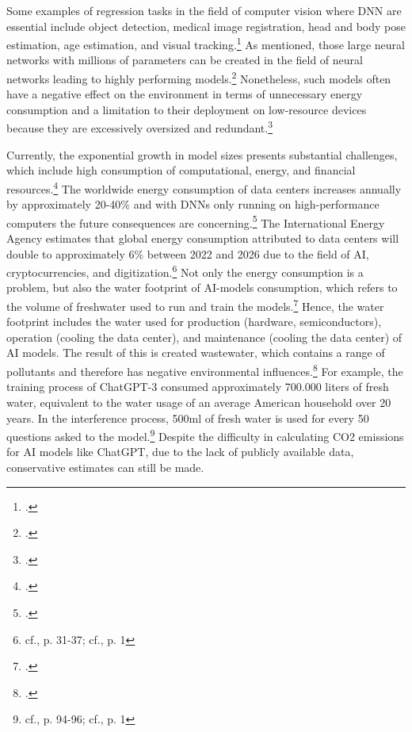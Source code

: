 Some examples of regression tasks in the field of computer vision where \ac{DNN} are essential include object detection, medical image registration, head and body pose estimation, age estimation, and visual tracking.\footcite[cf.][325-326]{gustafssonEnergyBasedModelsDeep2020}
As mentioned, those large neural networks with millions of parameters can be created in the field of neural networks leading to highly performing models.\footcite[cf.][152]{marinoDeepNeuralNetworks2023}
Nonetheless, such models often have a negative effect on the environment in terms of unnecessary energy consumption and a limitation to their deployment on low-resource devices because they are excessively oversized and redundant.\footcite[cf.][152]{marinoDeepNeuralNetworks2023}

Currently, the exponential growth in model sizes presents substantial challenges, which include high consumption of computational, energy, and financial resources.\footcite[cf.][1-2]{baiEfficiencySystematicSurvey2024}
The worldwide energy consumption of data centers increases annually by approximately 20-40\% and with \ac{DNN}s only running on high-performance computers the future
consequences are concerning.\footcite[cf.][1]{hintemannDataCenters20212022} 
The International Energy Agency estimates that global energy consumption attributed to data centers will double to approximately 6\% between 2022 and 2026 due to the field of AI, cryptocurrencies, and digitization.\footnote{cf.\cite{anon.Electricity2024Analysis2024}, p. 31-37; cf.\cite{jacksonAIBoomWill2024}, p. 1}
Not only the energy consumption is a problem, but also the water footprint of AI-models consumption, which refers to the volume of freshwater used to run and train the models.\footcite[cf.][92-93]{georgeEnvironmentalImpactAI2023}
Hence, the water footprint includes the water used for production (hardware, semiconductors), operation (cooling the data center), and maintenance (cooling the data center) of AI models.
The result of this is created wastewater, which contains a range of pollutants and therefore has negative environmental influences.\footcite[cf.][94-96]{georgeEnvironmentalImpactAI2023}
For example, the training process of ChatGPT-3 consumed approximately 700.000 liters of fresh water, equivalent to the water usage of an average American household over 20 years.
In the interference process, 500ml of fresh water is used for every 50 questions asked to the model.\footnote{cf.\cite{georgeEnvironmentalImpactAI2023}, p. 94-96; cf.\cite{anon.AIProgramsConsume}, p. 1}
Despite the difficulty in calculating CO2 emissions for AI models like ChatGPT, due to the lack of publicly available data, conservative estimates can still be made.
